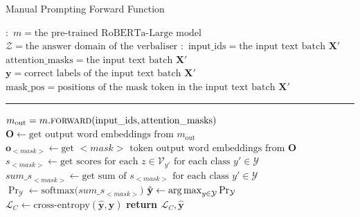 \begin{algorithm}
\caption{Manual Prompting Forward Function}\label{alg:manual-forward}
\begin{algorithmic}[1]
\small
\Require $\boldsymbol{:}$ \newline $m = \text{the pre-trained RoBERTa-Large model}$ \newline $\mathcal{Z} = \text{the answer domain of the verbaliser}$
\Ensure $\boldsymbol{:}$ \newline $\text{input\_ids} = \text{the input text batch }\mathbf{X}'$ \newline
    $\text{attention\_masks} = \text{the input text batch }\mathbf{X}' $   \newline
    $\mathbf{y} = \text{correct labels of the input text batch }\mathbf{X}'$ \newline
    $\text{mask\_pos} = \text{positions of the mask token in the input text batch }\mathbf{X}'$
\vspace{0.3em}
\hrule
\vspace{0.3em}
\State $m_\text{out} = m.\Call{\text{forward}}{\text{input\_ids}, \text{attention\_masks}}$
\State $\textbf{O} \gets \text{get output word embeddings from $m_\text{out}$}$  
 {\color{mylightgrey}}
 \State $\textbf{o}_{<\textit{mask}>} \gets \text{get $<\textit{mask}>$ token output word embeddings from $\textbf{O}$}$
\State $s_{<\textit{mask}>} \gets \text{get scores for each $z \in \mathcal{V}_{y'}$ for each class $y' \in \mathcal{Y}$}$ {\color{mylightgrey}}
\State ${sum\_s}_{<\textit{mask}>} \gets \text{get sum of $s_{<\textit{mask}>}$ for each class $y' \in \mathcal{Y}$}$ {\color{mylightgrey}}
\State $\Pr_{\mathcal{Y}} \gets \text{softmax(${sum\_s}_{<\textit{mask}>}$)}$
{\color{mylightgrey}}
\State $\hat{\mathbf{y}} \gets \operatorname*{arg\,max}_{y \in \mathcal{Y}} \Pr_{\mathcal{Y}}$
{\color{mylightgrey}}
\State $\mathcal{L}_C \gets \text{cross-entropy}(\hat{\mathbf{y}},\mathbf{y})$
{\color{mylightgrey}}
\State \textbf{return $\mathcal{L}_C, \hat{\mathbf{y}}$}
{\color{mylightgrey}}
\EndFunction
\end{algorithmic}
\end{algorithm}


